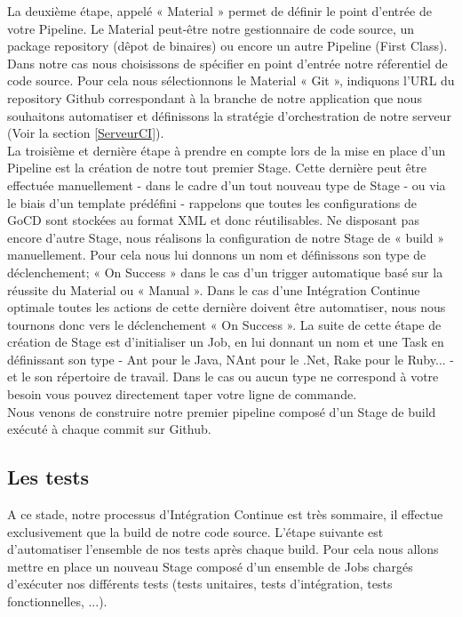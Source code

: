       La deuxième étape, appelé « Material » permet de définir le point d'entrée de votre Pipeline. Le Material peut-être notre gestionnaire de code source, un package repository (dêpot de binaires) ou encore un autre Pipeline (First Class). Dans notre cas nous choisissons de spécifier en point d'entrée notre réferentiel de code source. Pour cela nous sélectionnons le Material « Git », indiquons l'URL du repository Github correspondant à la branche de notre application que nous souhaitons automatiser et définissons la stratégie d'orchestration de notre serveur (Voir la section \ref{ServeurCI}).\\

      La troisième et dernière étape à prendre en compte lors de la mise en place d'un Pipeline est la création de notre tout premier Stage. Cette dernière peut être effectuée manuellement - dans le cadre d'un tout nouveau type de Stage - ou via le biais d'un template prédéfini - rappelons que toutes les configurations de GoCD sont stockées au format XML et donc réutilisables. Ne disposant pas encore d'autre Stage, nous réalisons la configuration de notre Stage de « build » manuellement. Pour cela nous lui donnons un nom et définissons son type de déclenchement; « On Success » dans le cas d'un trigger automatique basé sur la réussite du Material ou « Manual ». Dans le cas d'une Intégration Continue optimale toutes les actions de cette dernière doivent être automatiser, nous nous tournons donc vers le déclenchement « On Success ». La suite de cette étape de création de Stage est d'initialiser un Job, en lui donnant un nom et une Task en définissant son type - Ant pour le Java, NAnt pour le .Net, Rake pour le Ruby... - et le son répertoire de travail. Dans le cas ou aucun type ne correspond à votre besoin vous pouvez directement taper votre ligne de commande.\\

      Nous venons de construire notre premier pipeline composé d'un Stage de build exécuté à chaque commit sur Github.

      \subsection{Les tests}
      A ce stade, notre processus d'Intégration Continue est très sommaire, il effectue exclusivement que la build de notre code source. L'étape suivante est d'automatiser l'ensemble de nos tests après chaque build. Pour cela nous allons mettre en place un nouveau Stage composé d'un ensemble de Jobs chargés d'exécuter nos différents tests (tests unitaires, tests d'intégration, tests fonctionnelles, ...).\\

